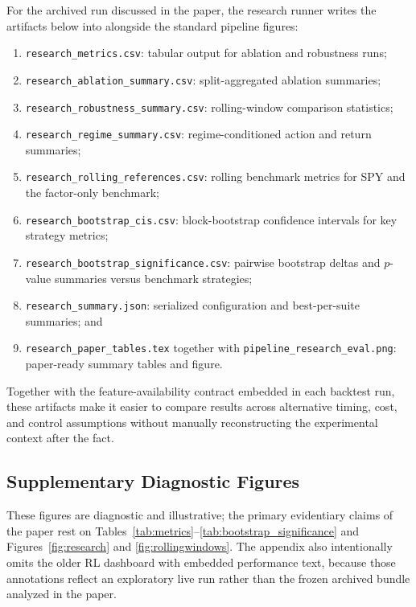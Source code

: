 \documentclass[10pt,twocolumn]{article}
\begin{document}
For the archived run discussed in the paper, the research runner writes the
artifacts below into
 alongside the standard
pipeline figures:
\begin{enumerate}[leftmargin=1.5em, itemsep=2pt, topsep=4pt]
\item \texttt{research\_metrics.csv}: tabular output for ablation and robustness runs;
\item \texttt{research\_ablation\_summary.csv}: split-aggregated ablation summaries;
\item \texttt{research\_robustness\_summary.csv}: rolling-window comparison statistics;
\item \texttt{research\_regime\_summary.csv}: regime-conditioned action and return summaries;
\item \texttt{research\_rolling\_references.csv}: rolling benchmark metrics for SPY and the factor-only benchmark;
\item \texttt{research\_bootstrap\_cis.csv}: block-bootstrap confidence intervals for key strategy metrics;
\item \texttt{research\_bootstrap\_significance.csv}: pairwise bootstrap deltas and $p$-value summaries versus benchmark strategies;
\item \texttt{research\_summary.json}: serialized configuration and best-per-suite summaries; and
\item \texttt{research\_paper\_tables.tex} together with
      \texttt{pipeline\_research\_eval.png}: paper-ready summary tables and
      figure.
\end{enumerate}

Together with the feature-availability contract embedded in each backtest run,
these artifacts make it easier to compare results across alternative timing,
cost, and control assumptions without manually reconstructing the experimental
context after the fact.

\subsection{Supplementary Diagnostic Figures}

These figures are diagnostic and illustrative; the primary evidentiary claims
of the paper rest on Tables~\ref{tab:metrics}--\ref{tab:bootstrap_significance}
and Figures~\ref{fig:research} and \ref{fig:rollingwindows}. The appendix also
intentionally omits the older RL dashboard with embedded performance text,
because those annotations reflect an exploratory live run rather than the frozen
archived bundle analyzed in the paper.
\end{document}
